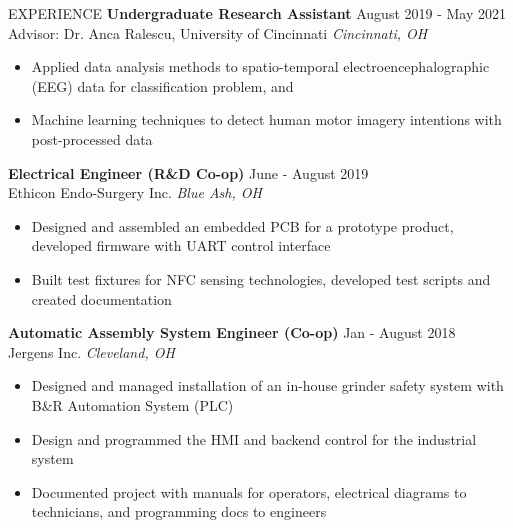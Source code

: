 \documentclass{lib/resume} %
\begin{document}
\begin{rSection}{EXPERIENCE}
    \textbf{Undergraduate Research Assistant} \hfill August 2019 - May 2021 \\
    Advisor: Dr. Anca Ralescu, University of Cincinnati \hfill \textit{Cincinnati, OH}
    \begin{itemize}
        \itemsep -4pt {}
        \item Applied data analysis methods to spatio-temporal electroencephalographic (EEG) data for classification problem, and
        \item Machine learning techniques to detect human motor imagery intentions with post-processed data
    \end{itemize}


    \textbf{Electrical Engineer (R\&D Co-op)} \hfill June - August 2019\\
    Ethicon Endo-Surgery Inc. \hfill \textit{Blue Ash, OH}
    \begin{itemize}
        \itemsep -4pt {}
        \item Designed and assembled an embedded PCB for a prototype product, developed firmware with UART control interface
        \item Built test fixtures for NFC sensing technologies, developed test scripts and created documentation
    \end{itemize}


    \textbf{Automatic Assembly System Engineer (Co-op)} \hfill Jan - August 2018
    \\	Jergens Inc. \hfill \textit{Cleveland, OH}
    \begin{itemize}
        \itemsep -4pt {}
        \item Designed and managed installation of an in-house grinder safety system with B\&R Automation System (PLC)
        \item Design and programmed the HMI and backend control for the industrial system
        \item Documented project with manuals for operators, electrical diagrams to technicians, and programming docs to engineers
    \end{itemize}
\end{rSection}
\end{document}
